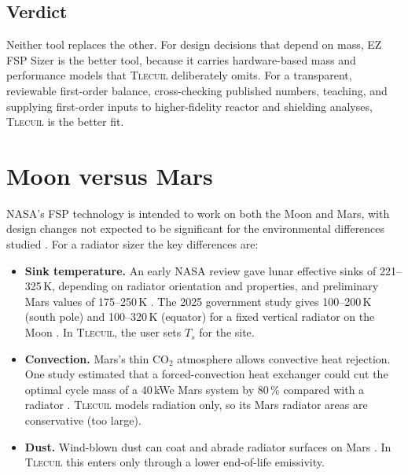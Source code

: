 \documentclass[11pt]{article}
\numberwithin{equation}{section}
\numberwithin{table}{section}
\newcommand{\tlecuil}{\textsc{Tlecuil}}
\begin{document}
\subsection{Verdict}
Neither tool replaces the other. For design decisions that depend on mass, EZ FSP
Sizer is the better tool, because it carries hardware-based mass and performance
models that \tlecuil{} deliberately omits. For a transparent, reviewable first-order
balance, cross-checking published numbers, teaching, and supplying first-order inputs
to higher-fidelity reactor and shielding analyses, \tlecuil{} is the better fit.

\section{Moon versus Mars}\label{sec:mars}
NASA's FSP technology is intended to work on both the Moon and Mars, with design
changes not expected to be significant for the environmental differences studied
\cite{fsp2010icd,poston2011mars}. For a radiator sizer the key differences are:
\begin{itemize}
  \item \textbf{Sink temperature.} An early NASA review gave lunar effective sinks of
        221--325\,K, depending on radiator orientation and properties, and
        preliminary Mars values of 175--250\,K \cite{perezdavis1992env}. The 2025
        government study gives 100--200\,K (south pole) and 100--320\,K (equator) for
        a fixed vertical radiator on the Moon \cite{mason2025trades}. In \tlecuil{},
        the user sets $T_s$ for the site.
  \item \textbf{Convection.} Mars's thin CO$_2$ atmosphere allows convective heat
        rejection. One study estimated that a forced-convection heat exchanger could
        cut the optimal cycle mass of a 40\,kWe Mars system by 80\,\% compared with a
        radiator \cite{colgan_marsconvection}. \tlecuil{} models radiation only, so
        its Mars radiator areas are conservative (too large).
  \item \textbf{Dust.} Wind-blown dust can coat and abrade radiator surfaces on Mars
        \cite{gaier1991dust,perezdavis1992env}. In \tlecuil{} this enters only through
        a lower end-of-life emissivity.
\end{itemize}

\end{document}
